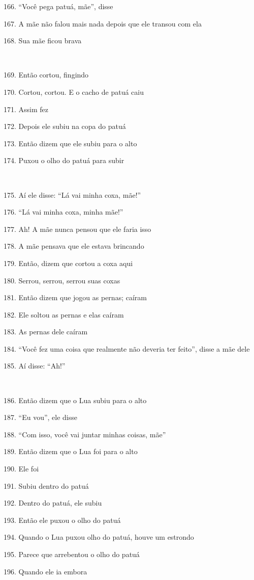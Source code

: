 166. ``Você pega patuá, mãe'', disse

167. A mãe não falou mais nada depois que ele transou com ela

168. Sua mãe ficou brava

~

169. Então cortou, fingindo

170. Cortou, cortou. E o cacho de patuá caiu

171. Assim fez

172. Depois ele subiu na copa do patuá

173. Então dizem que ele subiu para o alto

174. Puxou o olho do patuá para subir

~

175. Aí ele disse: ``Lá vai minha coxa, mãe!''

176. ``Lá vai minha coxa, minha mãe!''

177. Ah! A mãe nunca pensou que ele faria isso

178. A mãe pensava que ele estava brincando

179. Então, dizem que cortou a coxa aqui

180. Serrou, serrou, serrou suas coxas

181. Então dizem que jogou as pernas; caíram

182. Ele soltou as pernas e elas caíram

183. As pernas dele caíram

184. ``Você fez uma coisa que realmente não deveria ter feito'', disse a
mãe dele

185. Aí disse: ``Ah!''

~

186. Então dizem que o Lua subiu para o alto

187. ``Eu vou'', ele disse

188. ``Com isso, você vai juntar minhas coisas, mãe''

189. Então dizem que o Lua foi para o alto

190. Ele foi

191. Subiu dentro do patuá

192. Dentro do patuá, ele subiu

193. Então ele puxou o olho do patuá

194. Quando o Lua puxou olho do patuá, houve um estrondo

195. Parece que arrebentou o olho do patuá

196. Quando ele ia embora

